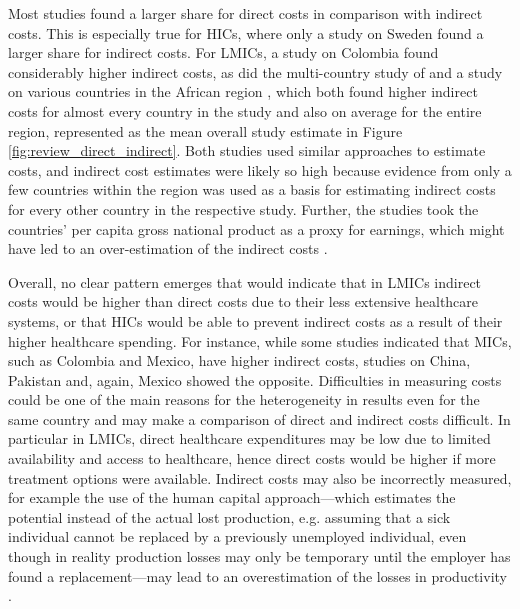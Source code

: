 Most studies found a larger share for direct costs in comparison with indirect costs. This is especially true for \acp{HIC}, where only a study on Sweden \parencite{Bolin2009d} found a larger share for indirect costs. For \acp{LMIC}, a study on Colombia \parencite{Gonzalez2009b} found considerably higher indirect costs, as did the multi-country study of \textcite{Barcelo2003} and a study on various countries in the African region \parencite{Kirigia2009}, which both found higher indirect costs for almost every country in the study and also on average for the entire region, represented as the mean overall study estimate in Figure \ref{fig:review_direct_indirect}.  Both studies used similar approaches to estimate costs, and indirect cost estimates were likely so high because evidence from only a few countries within the region was used as a basis for estimating indirect costs for every other country in the respective study. Further, the studies took the countries' per capita gross national product as a proxy for earnings, which might have led to an over-estimation of the indirect costs \parencite{Kirigia2009}. 

Overall, no clear pattern emerges that would indicate that in \acp{LMIC} indirect costs would be higher than direct costs due to their less extensive healthcare systems, or that \acp{HIC} would be able to prevent indirect costs as a result of their higher healthcare spending. For instance, while some studies indicated that \acp{MIC}, such as Colombia and Mexico, have higher indirect costs, studies on China, Pakistan and, again, Mexico showed the opposite. Difficulties in measuring costs could be one of the main reasons for the heterogeneity in results even for the same country and may make a comparison of direct and indirect costs difficult. In particular in \acp{LMIC}, direct healthcare expenditures may be low due to limited availability and access to healthcare, hence direct costs would be higher if more treatment options were available. Indirect costs may also be incorrectly measured, for example the use of the human capital approach---which estimates the potential instead of the actual lost production, e.g. assuming that a sick individual cannot be replaced by a previously unemployed individual, even though in reality production losses may only be temporary until the employer has found a replacement---may lead to an overestimation of the losses in productivity \parencite{Segel2006}. 

